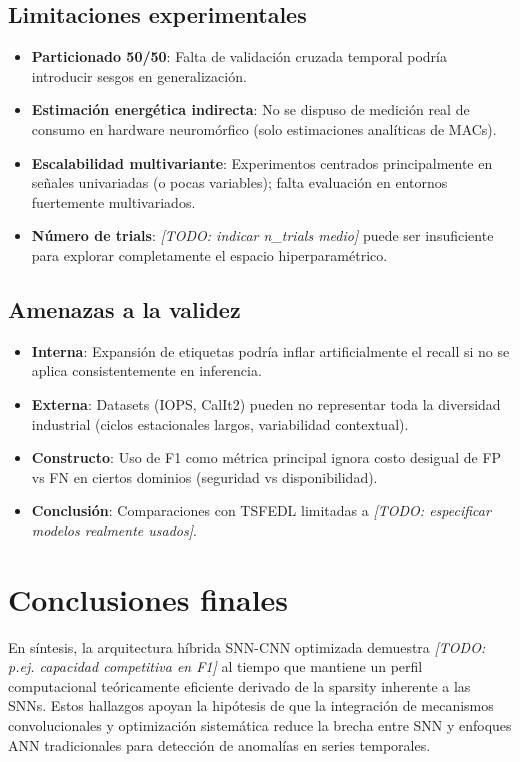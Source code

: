 \subsection{Limitaciones experimentales}
\begin{itemize}
    \item \textbf{Particionado 50/50}: Falta de validación cruzada temporal podría introducir sesgos en generalización.
    \item \textbf{Estimación energética indirecta}: No se dispuso de medición real de consumo en hardware neuromórfico (solo estimaciones analíticas de MACs).
    \item \textbf{Escalabilidad multivariante}: Experimentos centrados principalmente en señales univariadas (o pocas variables); falta evaluación en entornos fuertemente multivariados.
    \item \textbf{Número de trials}: \textit{[TODO: indicar n\_trials medio]} puede ser insuficiente para explorar completamente el espacio hiperparamétrico.
\end{itemize}

\subsection{Amenazas a la validez}
\begin{itemize}
    \item \textbf{Interna}: Expansión de etiquetas podría inflar artificialmente el recall si no se aplica consistentemente en inferencia.
    \item \textbf{Externa}: Datasets (IOPS, CalIt2) pueden no representar toda la diversidad industrial (ciclos estacionales largos, variabilidad contextual).
    \item \textbf{Constructo}: Uso de F1 como métrica principal ignora costo desigual de FP vs FN en ciertos dominios (seguridad vs disponibilidad).
    \item \textbf{Conclusión}: Comparaciones con TSFEDL limitadas a \textit{[TODO: especificar modelos realmente usados]}.
\end{itemize}

\section{Conclusiones finales}
En síntesis, la arquitectura híbrida SNN-CNN optimizada demuestra \textit{[TODO: p.ej. capacidad competitiva en F1]} al tiempo que mantiene un perfil computacional teóricamente eficiente derivado de la sparsity inherente a las SNNs. 
Estos hallazgos apoyan la hipótesis de que la integración de mecanismos convolucionales y optimización sistemática reduce la brecha entre SNN y enfoques ANN tradicionales para detección de anomalías en series temporales.

